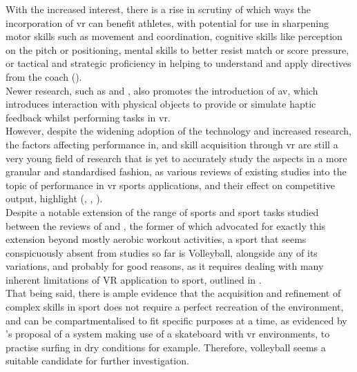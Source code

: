 With the increased interest, there is a rise in scrutiny of which ways the incorporation of \gls{vr} can benefit athletes, with potential for use in sharpening motor skills such as movement and coordination, cognitive skills like perception on the pitch or positioning, mental skills to better resist match or score pressure, or tactical and strategic proficiency in helping to understand and apply directives from the coach (\cite{richlan-2023-virtual}).\\
Newer research, such as \cite{ritter-2023-gymnastic} and \cite{gerwann-2025-immersive}, also promotes the introduction of \gls{av}, which introduces interaction with physical objects to provide or simulate haptic feedback whilst performing tasks in \gls{vr}.\\

However, despite the widening adoption of the technology and increased research, the factors affecting performance in, and skill acquisition through \gls{vr} are still a very young field of research that is yet to accurately study the aspects in a more granular and standardised fashion, as various reviews of existing studies into the topic of performance in \gls{vr} sports applications, and their effect on competitive output, highlight (\cite{neumann-2018-systematic}, \cite{richlan-2023-virtual}, \cite{gerwann-2025-immersive}).\\

Despite a notable extension of the range of sports and sport tasks studied between the reviews of \cite{neumann-2018-systematic} and \cite{richlan-2023-virtual}, the former of which advocated for exactly this extension beyond mostly aerobic workout activities, a sport that seems conspicuously absent from studies so far is Volleyball, alongside any of its variations, and probably for good reasons, as it requires dealing with many inherent limitations of VR application to sport, outlined in \cite{richlan-2023-virtual}.\\

That being said, there is ample evidence that the acquisition and refinement of complex skills in sport does not require a perfect recreation of the environment, and can be compartmentalised to fit specific purposes at a time, as evidenced by \cite{farley-2020-virtual}'s proposal of a system making use of a skateboard with \gls{vr} environments, to practise surfing in dry conditions for example. Therefore, volleyball seems a suitable candidate for further investigation.\\

